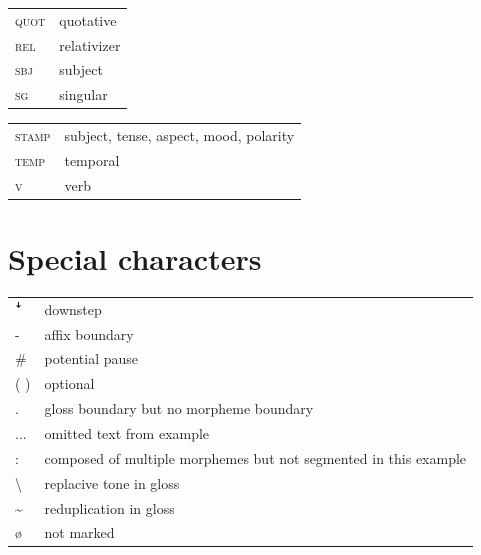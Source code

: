 \documentclass[output=paper,colorlinks,citecolor=brown]{langscibook}
\begin{document}
\begin{tabularx}{.45\textwidth}{lQ}
\scshape quot & quotative \\
\scshape rel & relativizer \\
\scshape sbj & subject \\
\scshape sg & singular \\
\end{tabularx}
\begin{tabularx}{.45\textwidth}{lQ}
\scshape stamp & subject, tense, aspect, mood, polarity \\
\scshape temp & temporal \\
\scshape v & verb \\
\end{tabularx}

\vspace{5mm}

\section*{Special characters}
\begin{tabularx}{\textwidth}{lQ}
ꜜ & downstep \\
- & affix boundary \\
$\#$ & potential pause \\
( ) & optional \\
. & gloss boundary but no morpheme boundary \\
... & omitted text from example \\
: & composed of multiple morphemes but not segmented in this example \\
\textbackslash  & replacive tone in gloss   \\
\textasciitilde & reduplication in gloss \\
ø & not marked \\
\end{tabularx}


\sloppy\printbibliography[heading=subbibliography,notkeyword=this]
\end{document}
